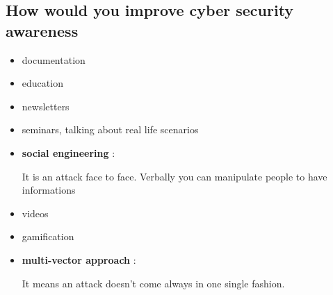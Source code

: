 \documentclass[a4paper,12pt]{article}
\begin{document}
\subsection {How would you improve cyber security awareness}
\begin{itemize}
\item documentation
\item education
\item newsletters
\item seminars, talking about real life scenarios
\item \textbf{social engineering}
:

It is an attack face to face. Verbally you can manipulate people to have informations
\item videos
\item gamification
\item \textbf{multi-vector approach}
:

It means an attack doesn't come always in one single fashion. 
\end{itemize}




\clearpage

\printindex
\end{document}
